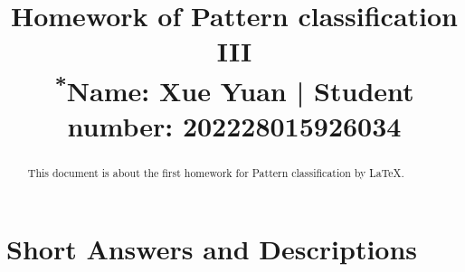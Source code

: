 \documentclass[homework]{IEEEtran}
\begin{document}
\title{Homework of Pattern classification III\\
{\footnotesize \textsuperscript{*}Name: Xue Yuan  | Student number: 202228015926034}
}

\author{}
\maketitle

\begin{abstract}
This document is about the first homework for Pattern classification by \LaTeX.
\end{abstract}

\section{Short Answers and Descriptions}
\end{document}
